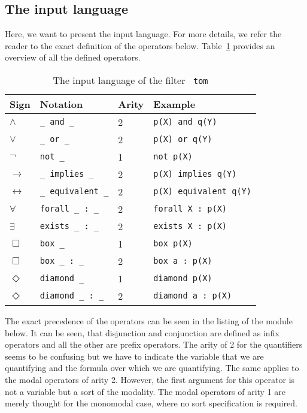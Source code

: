 \subsection*{The input language}

Here, we want to present the input language. For more details, we refer the
reader to the exact definition of the operators
below. Table~\ref{table:input.language} provides an overview of all the
defined operators.

\makevertother
\begin{table}[htp]
\begin{center}
\begin{tabular}{l|l|l|l}
Sign & Notation & Arity & Example \\ \hline
\(\wedge\) & {\tt \_ and \_} & 2 & {\tt p(X) and q(Y)} \\
\(\vee\) & {\tt \_ or \_} & 2 & {\tt p(X) or q(Y)} \\
\(\neg \) & {\tt not \_} & 1 & {\tt not p(X)} \\
\(\to\) & {\tt \_ implies \_} & 2 & {\tt p(X) implies q(Y)} \\
\(\leftrightarrow\) & {\tt \_ equivalent \_} & 2 & {\tt p(X) equivalent q(Y)} \\
\(\forall\) & {\tt forall \_ : \_} & 2 & {\tt forall X : p(X)} \\
\(\exists\) & {\tt exists \_ : \_} & 2 & {\tt exists X : p(X)} \\
\(\Box\) & {\tt box \_} & 1 & {\tt box p(X)} \\
\(\Box\) & {\tt box \_ : \_} & 2 & {\tt box a : p(X)} \\
\(\Diamond\) & {\tt diamond \_} & 1 & {\tt diamond p(X)} \\
\(\Diamond\) & {\tt diamond \_ : \_} & 2 & {\tt diamond a : p(X)} \\
\end{tabular}
\end{center}
\caption{\label{table:input.language} The input language of the filter {\tt
tom}}
\end{table}
\makevertactive

The exact precedence of the operators can be seen in the listing of the module
below. It can be seen, that disjunction and conjunction are defined as infix
operators and all the other are prefix operators. The arity of 2 for the
quantifiers seems to be confusing but we have to indicate the variable that
we are quantifying and the formula over which we are quantifying. The same
applies to the modal operators of arity 2. However, the first argument for
this operator is not a variable but a sort of the modality. The modal
operators of arity 1 are merely thought for the monomodal case, where no
sort specification is required.

